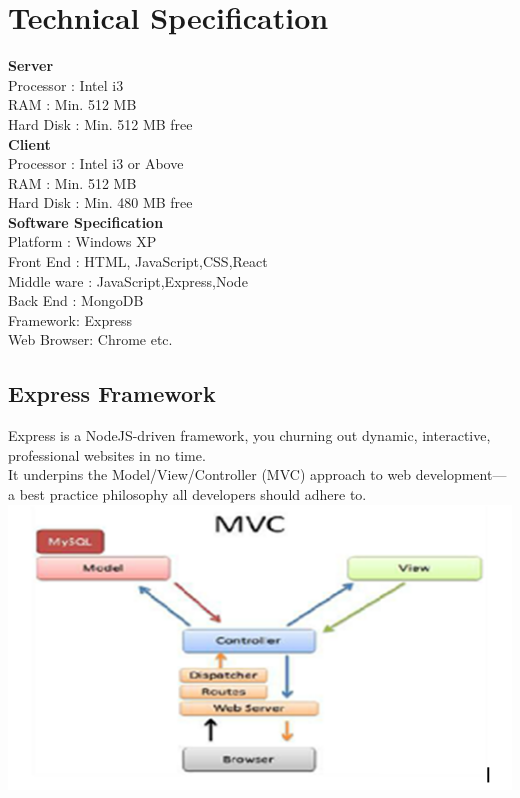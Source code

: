 \section{Technical Specification}
\textbullet \hspace{0.2cm} \textbf{Server}\\
Processor	:	Intel i3\\
RAM          	: 	Min. 512 MB\\
Hard Disk	: 	Min. 512 MB free\\
\textbullet \hspace{0.2cm} \textbf{Client}\\
Processor   	: 	Intel i3 or Above\\
RAM           	: 	Min. 512 MB\\
Hard Disk	: 	Min. 480 MB free\\
\textbullet \hspace{0.2cm} \textbf{Software Specification}\\
Platform	:  	Windows XP\\
Front End	: 	HTML, JavaScript,CSS,React \\
Middle ware	: 	JavaScript,Express,Node\\
Back End	: 	MongoDB \\
Framework: Express\\	
Web Browser: 	Chrome etc. \\


\subsection{Express Framework}
Express is a NodeJS-driven framework, you churning out dynamic, interactive, professional websites in no time.\\

\textbullet \hspace{0.2cm}	It underpins the Model/View/Controller (MVC) approach to web development—a best practice philosophy all developers should adhere to.\\

\includegraphics[scale=1.0]{Ch2/mvc.png}


\label{fig:MVC Model}



